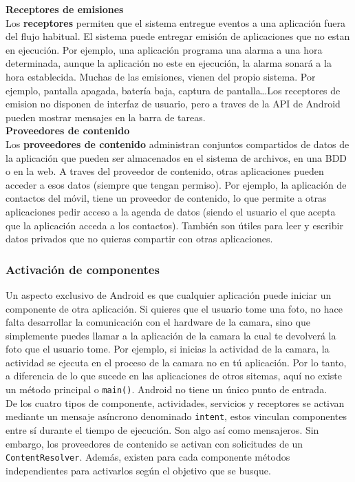 \textbf{Receptores de emisiones} \\
Los \textbf{receptores} permiten que el sistema entregue eventos a una aplicación fuera del flujo habitual. El sistema puede entregar emisión de aplicaciones que no estan en ejecución. Por ejemplo, una aplicación programa una alarma a una hora determinada, aunque la aplicación no este en ejecución, la alarma sonará a la hora establecida. Muchas de las emisiones, vienen del propio sistema. Por ejemplo, pantalla apagada, batería baja, captura de pantalla\dots Los receptores de emision no disponen de interfaz de usuario, pero a traves de la API de Android pueden mostrar mensajes en la barra de tareas. \\

\textbf{Proveedores de contenido} \\
Los \textbf{proveedores de contenido} administran conjuntos compartidos de datos de la aplicación que pueden ser almacenados en el sistema de archivos, en una BDD o en la web. A traves del proveedor de contenido, otras aplicaciones pueden acceder a esos datos (siempre que tengan permiso). Por ejemplo, la aplicación de contactos del móvil, tiene un proveedor de contenido, lo que permite a otras aplicaciones pedir acceso a la agenda de datos (siendo el usuario el que acepta que la aplicación acceda a los contactos). También son útiles para leer y escribir datos privados que no quieras compartir con otras aplicaciones.

\subsubsection{Activación de componentes}

Un aspecto exclusivo de Android es que cualquier aplicación puede iniciar un componente de otra aplicación. Si quieres que el usuario tome una foto, no hace falta desarrollar la comunicación con el hardware de la camara, sino que simplemente puedes llamar a la aplicación de la camara la cual te devolverá la foto que el usuario tome. Por ejemplo, si inicias la actividad de la camara, la actividad se ejecuta en el proceso de la camara no en tú aplicación. Por lo tanto, a diferencia de lo que sucede en las aplicaciones de otros sitemas, aquí no existe un método principal o \verb|main()|. Android no tiene un único punto de entrada. \\

De los cuatro tipos de componente, actividades, servicios y receptores se activan mediante un mensaje asíncrono denominado \verb |intent|, estos vinculan componentes entre sí durante el tiempo de ejecución. Son algo así como mensajeros. Sin embargo, los proveedores de contenido se activan con solicitudes de un \verb|ContentResolver|. Además, existen para cada componente métodos independientes para activarlos según el objetivo que se busque.
